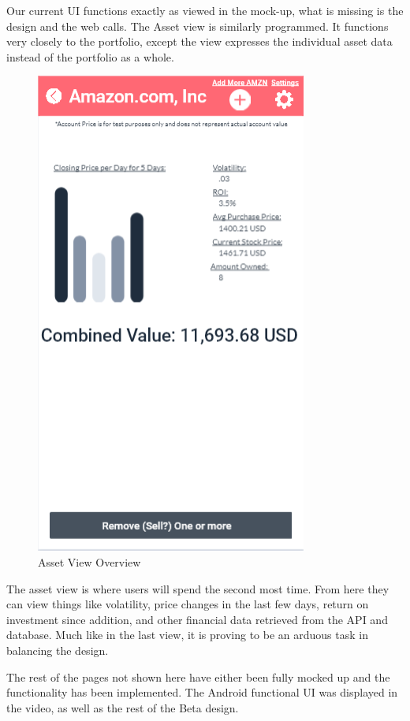 \documentclass[letterpaper,10pt,titlepage,journal,compsoc,draftclsnofoot,onecolumn]{IEEEtran}
\begin{document}
Our current UI functions exactly as viewed in the mock-up, what is missing is the design and the web calls. The Asset view is similarly programmed. It functions very closely to the portfolio, except the view expresses the individual asset data instead of the portfolio as a whole.

\begin{figure}[h]
   \caption{Asset View Overview}
   \includegraphics[scale=.5]{asset_screenshot}
\end{figure}

The asset view is where users will spend the second most time. From here they can view things like volatility, price changes in the last few days, return on investment since addition, and other financial data retrieved from the API and database. Much like in the last view, it is proving to be an arduous task in balancing the design.

The rest of the pages not shown here have either been fully mocked up and the functionality has been implemented. The Android functional UI was displayed in the video, as well as the rest of the Beta design. 
\end{document}
